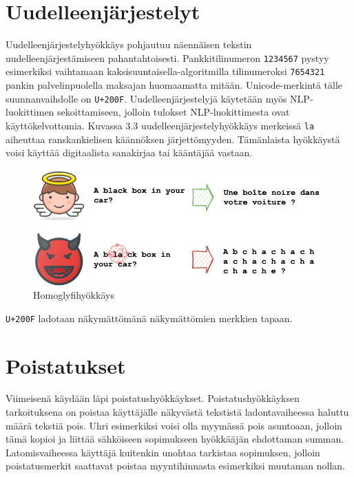 \section{Uudelleenjärjestelyt}
Uudelleenjärjestelyhyökkäys pohjautuu näennäisen tekstin uudelleenjärjestämiseen pahantahtoisesti. Pankkitilinumeron \texttt{1234567} pystyy esimerkiksi vaihtamaan kaksisuuntaisella-algoritmilla tilinumeroksi \texttt{7654321} pankin palvelinpuolella maksajan huomaamatta mitään. Unicode-merkintä tälle suunnanvaihdolle on \texttt{U+200F}. Uudelleenjärjestelyjä käytetään myös NLP-luokittimen sekoittamiseen, jolloin tulokset NLP-luokittimesta ovat käyttökelvottomia. Kuvassa 3.3 uudelleenjärjestelyhyökkäys merkeissä \texttt{la} aiheuttaa ranskankielisen käännöksen järjettömyyden. Tämänlaista hyökkäystä voisi käyttää digitaalista sanakirjaa tai kääntäjää vastaan. \citep{boucher2021bad}
\begin{figure}[t]
  \includegraphics[scale=0.599]{figures/reordering.png}
  \caption{Homoglyfihyökkäys \citep{boucher2021bad}}
\end{figure}
\texttt{U+200F} ladotaan näkymättömänä näkymättömien merkkien tapaan.

\section{Poistatukset}

Viimeisenä käydään läpi poistatushyökkäykset. Poistatushyökkäyksen tarkoituksena on poistaa käyttäjälle näkyvästä tekstistä ladontavaiheessa haluttu määrä tekstiä pois. Uhri esimerkiksi voisi olla myymässä pois asuntoaan, jolloin tämä kopioi ja liittää sähköiseen sopimukseen hyökkääjän ehdottaman summan. Latomisvaiheessa käyttäjä kuitenkin unohtaa tarkistaa sopimuksen, jolloin poistatusmerkit saattavat poistaa myyntihinnasta esimerkiksi muutaman nollan.

